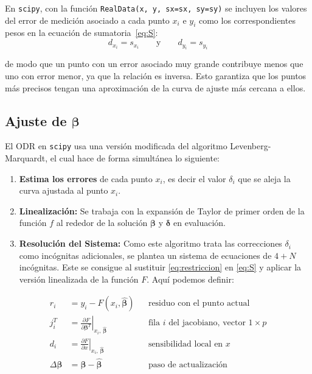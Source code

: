 En \texttt{scipy}, con la función \texttt{RealData(x, y, sx=sx, sy=sy)} se incluyen los valores del error de medición asociado a cada punto $x_i$ e $y_i$ como los correspondientes pesos en la ecuación de sumatoria~\ref{eq:S}:
\begin{equation}
    d_{x_i} = s_{x_i} \qquad \text{y} \qquad d_{y_i} = s_{y_i} \label{eq:pesos}
\end{equation}

de modo que un punto con un error asociado muy grande contribuye menos que uno con error menor, ya que la relación es inversa. Esto garantiza que los puntos más precisos tengan una aproximación de la curva de ajuste más cercana a ellos.

\subsection{Ajuste de \texorpdfstring{$\boldsymbol{\beta}$}{beta}}

El ODR en \texttt{scipy} usa una versión modificada del algoritmo Levenberg-Marquardt, el cual hace de forma simultánea lo siguiente:

\begin{enumerate}
    \item \textbf{Estima los errores} de cada punto $x_i$, es decir el valor $\delta_i$ que se aleja la curva ajustada al punto $x_i$.

    \item \textbf{Linealización:} Se trabaja con la expansión de Taylor de primer orden de la función $f$ al rededor de la solución $\boldsymbol{\beta}$ y $\boldsymbol{\delta}$ en evaluación.

    \item \textbf{Resolución del Sistema:} Como este algoritmo trata las correcciones $\delta_i$ como incógnitas adicionales, se plantea un sistema de ecuaciones de $4 + N$ incógnitas. Este se consigue al sustituir \eqref{eq:restriccion} en \eqref{eq:S} y aplicar la versión linealizada de la función $F$. Aquí podemos definir:
\end{enumerate}

\begin{align}
    r_i &= y_i - F(x_i, \hat{\boldsymbol{\beta}}) \tag{5.1} \label{eq:residuo}
    && \text{residuo con el punto actual}\\[6pt]
    j_i^T &= \left.\frac{\partial F}{\partial \boldsymbol{\beta}^T}\right|_{x_i,\,\hat{\boldsymbol{\beta}}} \tag{5.2} \label{eq:jacobfila}
    && \text{fila }i\text{ del jacobiano, vector }1\times p\\[6pt]
    d_i &= \left.\frac{\partial F}{\partial x}\right|_{x_i,\,\hat{\boldsymbol{\beta}}} \tag{5.3} \label{eq:sensib}
    && \text{sensibilidad local en }x\\[6pt]
    \Delta\boldsymbol{\beta} &= \boldsymbol{\beta} - \hat{\boldsymbol{\beta}} \tag{5.4} \label{eq:paso}
    && \text{paso de actualización}
\end{align}

